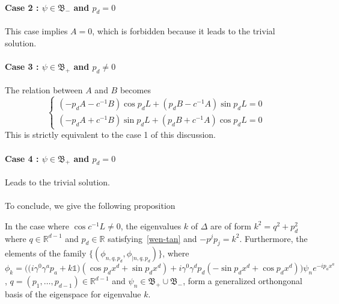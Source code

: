 \paragraph{Case 2 : $\psi \in \mathfrak{B}_-$ and $p_d = 0$}
This case implies $A = 0$, which is forbidden because it leads to the trivial solution.
%
\paragraph{Case 3 : $\psi \in \mathfrak{B}_+$ and $p_d \neq 0$}
The relation between $A$ and $B$ becomes
\begin{equation*}
\begin{cases}
(-p_d A - c^{-1} B)\cos p_d L + (p_d B - c^{-1}A)\sin p_d L = 0  \\
(-p_d A + c^{-1}B)\sin p_d L + (p_d B + c^{-1} A)\cos p_d L = 0 
\end{cases}
\end{equation*}
This is strictly equivalent to the case 1 of this discussion.
%
\paragraph{Case 4 : $\psi \in \mathfrak{B}_+$ and $p_d = 0$}
Leads to the trivial solution. \\\\
To conclude, we give the following proposition
\begin{proposition}
In the case where $\cos c^{-1}L \neq 0$,
the eigenvalues $k$ of $\Delta$ are of form $k^2 = q^2 + p^2_d $ where $q\in\mathbb{R}^{d-1}$ and $p_d\in \mathbb{R}$ satisfying~\cref{wen-tan} and $-p^jp_j = k^2$.
Furthermore, the elements of the family $\{(\phi_{n,q,p_d}, \phi_{|n,q,p_d})\}$, where
\begin{equation*}
\phi_k = \Big(\big(i\gamma^0\gamma^a p_a+k\mathbb{1}\big)(\cos p_d x^d + \sin p_d x^d) +
i\gamma^0\gamma^d p_d(-\sin p_d x^d + \cos p_d x^d)\Big) \psi_n e^{-ip_a x^a}
\end{equation*}
, $q=(p_1,\ldots, p_{d-1})\in\mathbb{R}^{d-1}$ and $\psi_n\in\mathfrak{B}_+\cup\mathfrak{B}_-$,
form a generalized orthongonal basis of the eigenspace for eigenvalue $k$.
\end{proposition}



